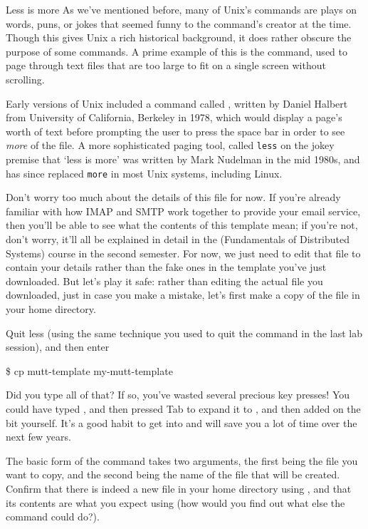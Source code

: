 \begin{diversion}{Less is more}
\label{diversion:less}
As we've mentioned before, many of Unix's commands are plays on words, puns, or jokes that seemed funny to the command's creator at the time. Though this gives Unix a rich historical background, it does rather obscure the purpose of some commands. A prime example of this is the  command, used to page through text files that are too large to fit on a single screen without scrolling. 

Early versions of Unix included a command called , written by Daniel Halbert from University of California, Berkeley in 1978, which would display a page's worth of text before prompting the user to press the space bar in order to see \textit{more} of the file. A more sophisticated paging tool, called \texttt{less} on the jokey premise that `less is more' was written by Mark Nudelman in the mid 1980s, and has since replaced \texttt{more} in most Unix systems, including Linux. 
\end{diversion}

Don't worry too much about the details of this file for now. If you're already familiar with how IMAP and SMTP work together to provide your email service, then you'll be able to see what the contents of this template mean; if you're not, don't worry, it'll all be explained in detail in the  (Fundamentals of Distributed Systems) course in the second semester. For now, we just need to edit that file to contain your details rather than the fake ones in the template you've just downloaded. But let's play it safe: rather than editing the actual file you downloaded, just in case you make a mistake, let's first make a copy of the file in your home directory. 


Quit less (using the same technique you used to quit the  command in the last lab session), and then enter

\begin{ttoutenv}
\$ cp mutt-template my-mutt-template
\end{ttoutenv}

Did you type all of that? If so, you've wasted several precious key presses! You could have typed , and then pressed Tab to expand it to , and then added on the  bit yourself. It's a good habit to get into and will save you a lot of time over the next few years.

The basic form of the  command takes two arguments, the first being the file you want to copy, and the second being the name of the file that will be created. Confirm that there is indeed a new file in your home directory using , and that its contents are what you expect using  (how would you find out what else the  command could do?). 

